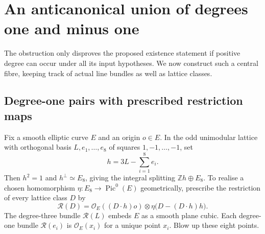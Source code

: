 \documentclass[11pt]{article}
\theoremstyle{definition}
\theoremstyle{remark}
\newcommand{\Z}{\mathbb Z}
\newcommand{\Pic}{\operatorname{Pic}}
\newcommand{\OO}{\mathcal O}
\begin{document}
\section{An anticanonical union of degrees one and minus one}

The obstruction only disproves the proposed existence statement if positive degree can occur under all its input hypotheses. We now construct such a central fibre, keeping track of actual line bundles as well as lattice classes.

\subsection{Degree-one pairs with prescribed restriction maps}
Fix a smooth elliptic curve $E$ and an origin $o\in E$. In the odd unimodular lattice with orthogonal basis $L,e_1,\ldots,e_8$ of squares $1,-1,\ldots,-1$, set
\[
h=3L-\sum_{i=1}^8e_i.
\]
Then $h^2=1$ and $h^\perp\simeq E_8$, giving the integral splitting $\Z h\oplus E_8$. To realise a chosen homomorphism $\eta:E_8\to\Pic^0(E)$ geometrically, prescribe the restriction of every lattice class $D$ by
\begin{equation}\label{eq:restriction}
\mathcal R(D)=\OO_E((D\cdot h)o)\otimes
\eta\bigl(D-(D\cdot h)h\bigr).
\end{equation}
The degree-three bundle $\mathcal R(L)$ embeds $E$ as a smooth plane cubic. Each degree-one bundle $\mathcal R(e_i)$ is $\OO_E(x_i)$ for a unique point $x_i$. Blow up these eight points.
\end{document}
